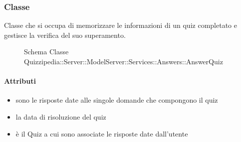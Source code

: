 \subsubsection{Classe }
Classe che si occupa di memorizzare le informazioni di un quiz completato e gestisce la verifica del suo superamento.
\begin{figure}[H]
\centering
\noindent{}
\caption[Schema Classe AnswerQuiz]{Schema Classe Quizzipedia::Server::ModelServer::Services::Answers::AnswerQuiz}
\end{figure}
\paragraph{Attributi}
\begin{itemize}
\item {}
\newline
sono le risposte date alle singole domande che compongono il quiz
\item {}
\newline
la data di risoluzione del quiz
\item {}
\newline
è il Quiz a cui sono associate le risposte date dall'utente
\end{itemize}
